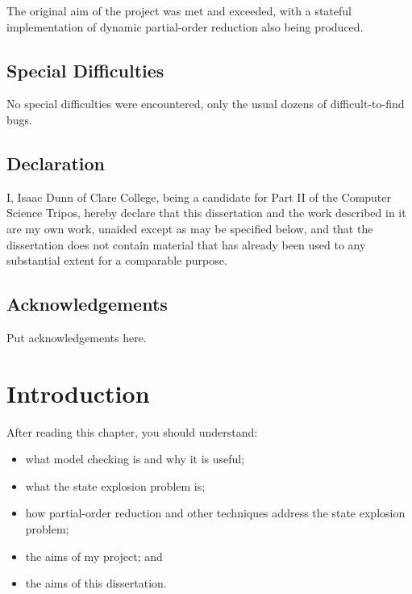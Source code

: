 \documentclass[12pt,a4paper,twoside,openright]{report}
\newenvironment{understandinglist}
	{\begin{itemize} \itemsep 0em}{\end{itemize}}
\begin{document}
The original aim of the project was met and exceeded, with
a stateful implementation of dynamic partial-order reduction
also being produced.

\section*{Special Difficulties}

No special difficulties were encountered, only the usual dozens of
difficult-to-find bugs.
 
\newpage
\section*{Declaration}

I, Isaac Dunn of Clare College, being a candidate for Part II of the Computer
Science Tripos, hereby declare
that this dissertation and the work described in it are my own work,
unaided except as may be specified below, and that the dissertation
does not contain material that has already been used to any substantial
extent for a comparable purpose.

\bigskip
{}

\bigskip
{}

\tableofcontents

\listoffigures

\newpage
\section*{Acknowledgements}

Put acknowledgements here.


\pagestyle{headings}

\chapter{Introduction}
After reading this chapter,
you should understand:
\begin{understandinglist}
	\item what model checking is and why it is useful;
	\item what the state explosion problem is;
	\item how partial-order reduction and other
	techniques address the state explosion problem;
	\item the aims of my project; and
	\item the aims of this dissertation.
\end{understandinglist}
\end{document}
